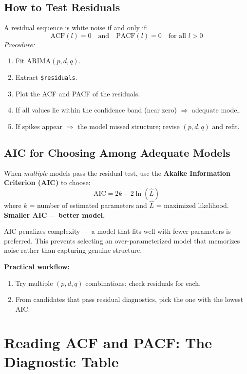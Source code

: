 \documentclass[11pt]{article}
\begin{document}
\subsection{How to Test Residuals}
A residual sequence is white noise if and only if:
\[
\text{ACF}(l) = 0 \quad\text{and}\quad \text{PACF}(l) = 0
\quad\text{for all } l > 0
\]
\textit{Procedure:}
\begin{enumerate}
    \item Fit ARIMA$(p,d,q)$.
    \item Extract \texttt{\$residuals}.
    \item Plot the ACF and PACF of the residuals.
    \item If all values lie within the confidence band (near zero) $\Rightarrow$
      adequate model.
    \item If spikes appear $\Rightarrow$ the model missed structure; revise
      $(p,d,q)$ and refit.
\end{enumerate}

\subsection{AIC for Choosing Among Adequate Models}
When \emph{multiple} models pass the residual test, use the
\textbf{Akaike Information Criterion (AIC)} to choose:
\[
\text{AIC} = 2k - 2\ln(\hat{L})
\]
where $k$ = number of estimated parameters and $\hat{L}$ = maximized
likelihood. \textbf{Smaller AIC = better model.}

AIC penalizes complexity --- a model that fits well with fewer parameters
is preferred. This prevents selecting an over-parameterized model that
memorizes noise rather than capturing genuine structure.

\textbf{Practical workflow:}
\begin{enumerate}
    \item Try multiple $(p,d,q)$ combinations; check residuals for each.
    \item From candidates that pass residual diagnostics, pick the one with
      the lowest AIC.
\end{enumerate}


\section{Reading ACF and PACF: The Diagnostic Table}
\end{document}
